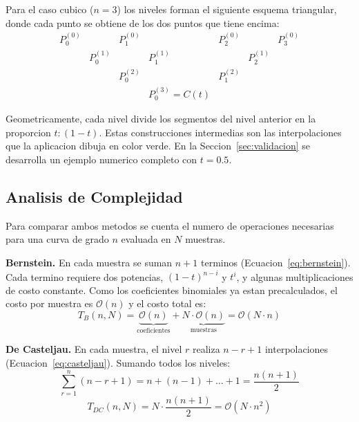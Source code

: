 Para el caso cubico ($n = 3$) los niveles forman el siguiente esquema triangular, donde cada punto se obtiene de los dos puntos que tiene encima:
\begin{equation}
\label{eq:fund_triangulo}
\begin{array}{ccccccc}
P_0^{(0)} &  & P_1^{(0)} &  & P_2^{(0)} &  & P_3^{(0)} \\
 & P_0^{(1)} &  & P_1^{(1)} &  & P_2^{(1)} &  \\
 &  & P_0^{(2)} &  & P_1^{(2)} &  &  \\
 & & & P_0^{(3)} = C(t) & & &
\end{array}
\end{equation}

Geometricamente, cada nivel divide los segmentos del nivel anterior en la proporcion $t : (1 - t)$. Estas construcciones intermedias son las interpolaciones que la aplicacion dibuja en color verde. En la Seccion~\ref{sec:validacion} se desarrolla un ejemplo numerico completo con $t = 0.5$.

\subsection{Analisis de Complejidad}
\label{subsec:fund_complejidad}

Para comparar ambos metodos se cuenta el numero de operaciones necesarias para una curva de grado $n$ evaluada en $N$ muestras.

\textbf{Bernstein.} En cada muestra se suman $n + 1$ terminos (Ecuacion~\ref{eq:bernstein}). Cada termino requiere dos potencias, $(1-t)^{n-i}$ y $t^{i}$, y algunas multiplicaciones de costo constante. Como los coeficientes binomiales ya estan precalculados, el costo por muestra es $\mathcal{O}(n)$ y el costo total es:
\begin{equation}
\label{eq:fund_costo_bernstein}
T_{B}(n, N) = \underbrace{\mathcal{O}(n)}_{\text{coeficientes}} + \underbrace{N \cdot \mathcal{O}(n)}_{\text{muestras}} = \mathcal{O}(N \cdot n)
\end{equation}

\textbf{De Casteljau.} En cada muestra, el nivel $r$ realiza $n - r + 1$ interpolaciones (Ecuacion~\ref{eq:casteljau}). Sumando todos los niveles:
\begin{equation}
\label{eq:fund_operaciones_casteljau}
\sum_{r=1}^{n} (n - r + 1) = n + (n - 1) + \dots + 1 = \frac{n(n+1)}{2}
\end{equation}
\begin{equation}
\label{eq:fund_costo_casteljau}
T_{DC}(n, N) = N \cdot \frac{n(n+1)}{2} = \mathcal{O}(N \cdot n^2)
\end{equation}

